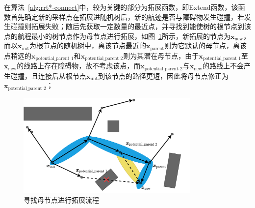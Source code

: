 在算法~\ref{alg:rrt*-connect}中，较为关键的部分为拓展函数，即Extend函数，该函数首先确定新的采样点在拓展进随机树后，新的航迹是否与障碍物发生碰撞，若发生碰撞则拓展失败；随后先获取一定数量的最近点，并寻找到能使树的根节点到该点的航程最小的树节点作为母节点进行拓展，如图~\ref{fig:寻找母节点进行拓展流程}所示，新拓展的节点为\( \boldsymbol{x}_{\textrm{new}} \)，而以\( \boldsymbol{x}_{\textrm{init}} \)为根节点的随机树中，离该节点最近的\( \boldsymbol{x}_{\textrm{parent}} \)则为它默认的母节点，离该点稍远的\( \boldsymbol{x}_{\text{potential\_parent 1}} \)和\( \boldsymbol{x}_{\text{potential\_parent 2}} \)则为其潜在母节点，由于\( \boldsymbol{x}_{\textrm{potential\_parent 1}} \)至\( \boldsymbol{x}_{\textrm{new}} \)的线路上存在障碍物，故不考虑该点，而\( \boldsymbol{x}_{\textrm{potential\_parent 2}} \)与\( \boldsymbol{x}_{\textrm{new}} \)的路线上不会产生碰撞，且连接后从根节点\( \boldsymbol{x}_{\textrm{init}} \)到该节点的路径更短，因此将母节点修正为\( \boldsymbol{x}_{\textrm{potential\_parent 2}} \)；

\begin{figure}[!htbp]
    \centering
    \includegraphics[width=0.8\textwidth]{images/choose_parent.pdf}
    \caption{寻找母节点进行拓展流程}
    \label{fig:寻找母节点进行拓展流程}
\end{figure}

